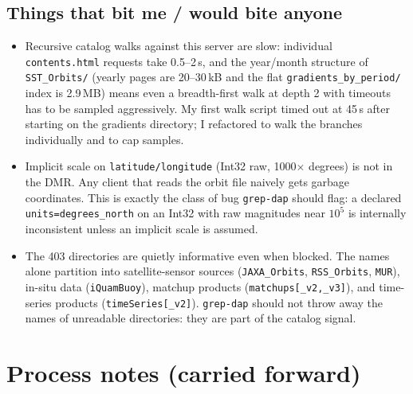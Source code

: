 \documentclass[11pt]{article}
\begin{document}
\subsection{Things that bit me / would bite anyone}

\begin{itemize}
  \item Recursive catalog walks against this server are slow:
    individual \texttt{contents.html} requests take 0.5--2\,s, and
    the year/month structure of \texttt{SST\_Orbits/} (yearly
    pages are 20--30\,kB and the flat
    \texttt{gradients\_by\_period/} index is 2.9\,MB) means even a
    breadth-first walk at depth 2 with timeouts has to be sampled
    aggressively. My first walk script timed out at 45\,s after
    starting on the gradients directory; I refactored to walk the
    branches individually and to cap samples.
  \item Implicit scale on \texttt{latitude/longitude} (Int32 raw,
    1000$\times$ degrees) is not in the DMR. Any client that
    reads the orbit file naively gets garbage coordinates. This is
    exactly the class of bug \texttt{grep-dap} should flag: a
    declared \texttt{units=degrees\_north} on an Int32 with raw
    magnitudes near $10^5$ is internally inconsistent unless an
    implicit scale is assumed.
  \item The 403 directories are quietly informative even when
    blocked. The names alone partition into satellite-sensor
    sources (\texttt{JAXA\_Orbits}, \texttt{RSS\_Orbits},
    \texttt{MUR}), in-situ data (\texttt{iQuamBuoy}), matchup
    products (\texttt{matchups[\_v2,\_v3]}), and time-series
    products (\texttt{timeSeries[\_v2]}). \texttt{grep-dap} should
    not throw away the names of unreadable directories: they are
    part of the catalog signal.
\end{itemize}

\section{Process notes (carried forward)}
\end{document}
